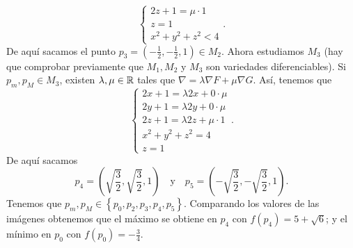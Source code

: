 \begin{eg}
\begin{enumerate}
\[\begin{cases}
2z + 1 = \mu \cdot 1 \\
z = 1 \\
x^{2} +y^{2}+z^{2} < 4
\end{cases}
.\]
De aquí sacamos el punto $\displaystyle p_{3} = \left(-\frac{1}{2}, -\frac{1}{2}, 1\right) \in M_{2} $. Ahora estudiamos $\displaystyle M_{3} $ (hay que comprobar previamente que $\displaystyle M_{1}, M_{2} $ y $\displaystyle M_{3} $ son variedades diferenciables). 
Si $\displaystyle p_{m}, p_{M} \in M_{3} $, existen $\displaystyle \lambda, \mu \in \mathbb{R} $ tales que $\displaystyle \nabla = \lambda \nabla F + \mu \nabla G $. Así, tenemos que
\[
\begin{cases}
2x+1 = \lambda 2x + 0 \cdot \mu \\
2y+1 = \lambda 2y + 0 \cdot \mu \\
2z + 1 = \lambda 2z + \mu \cdot 1 \\
x^{2} +y^{2} +z^{2} = 4 \\
z = 1
\end{cases}
.\]
De aquí sacamos 
\[p_{4} = \left(\sqrt{\frac{3}{2}}, \sqrt{\frac{3}{2}}, 1\right) \quad \text{y} \quad p_{5} = \left(-\sqrt{\frac{3}{2}}, -\sqrt{\frac{3}{2}}, 1\right) .\]
Tenemos que $\displaystyle p_{m}, p_{M} \in \left\{ p_{0}, p_{2}, p_{3}, p_{4}, p_{5}\right\}  $. Comparando los valores de las imágenes obtenemos que el máximo se obtiene en $\displaystyle p_{4} $ con $\displaystyle f\left(p_{4}\right) = 5 +\sqrt{6} $; y el mínimo en $\displaystyle p_{0} $ con $\displaystyle f\left(p_{0}\right) = -\frac{3}{4} $.
\end{enumerate}

\end{eg}

